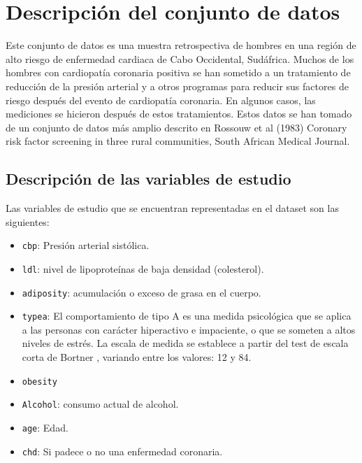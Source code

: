 \documentclass[a4paper, 9pt]{article}
\begin{document}



\section{Descripción del conjunto de datos}
\label{sec:descripcion-datos}
\noindent

Este conjunto de datos es una muestra retrospectiva de hombres en una región de alto riesgo de enfermedad cardiaca de Cabo Occidental, Sudáfrica. Muchos de los hombres con cardiopatía coronaria positiva se han sometido a un tratamiento de reducción de la presión arterial y a otros programas para reducir sus factores de riesgo después del evento de cardiopatía coronaria. En algunos casos, las mediciones se hicieron después de estos tratamientos. Estos datos se han tomado de un conjunto de datos más amplio descrito en Rossouw et al (1983) Coronary risk factor screening in three rural communities, South African Medical Journal.

\subsection{Descripción de las variables de estudio}
Las variables de estudio que se encuentran representadas en el dataset son las siguientes:

\begin{itemize}
    \item \texttt{cbp}: Presión arterial sistólica.
    \item \texttt{ldl}: nivel de lipoproteínas de baja densidad (colesterol).
    \item \texttt{adiposity}: acumulación o exceso de grasa en el cuerpo.
    \item \texttt{typea}: El comportamiento de tipo A es una medida psicológica que se aplica a las personas con carácter hiperactivo e impaciente, o que se someten a altos niveles de estrés. La escala de medida se establece a partir del test de escala corta de Bortner \cite{bortner1969short}, variando entre los valores: 12 y 84.
    \item \texttt{obesity}
    \item \texttt{Alcohol}: consumo actual de alcohol.
    \item \texttt{age}: Edad.
    \item \texttt{chd}: Si padece o no una enfermedad coronaria.
\end{itemize}
\end{document}
